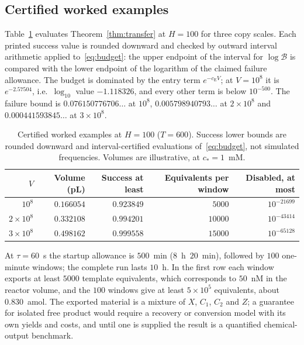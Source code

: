 \documentclass[11pt,a4paper]{article}
\theoremstyle{plain}
\theoremstyle{definition}
\theoremstyle{remark}
\newcommand{\Bud}{\mathcal B}
\newcommand{\cE}{c_{\mathrm E}}
\begin{document}
\subsection{Certified worked examples}
Table~\ref{tab:examples} evaluates Theorem~\ref{thm:transfer} at $H=100$ for three copy scales. Each printed success value is rounded downward and checked by outward interval arithmetic applied to~\eqref{eq:budget}: the upper endpoint of the interval for $\log\Bud$ is compared with the lower endpoint of the logarithm of the claimed failure allowance. The budget is dominated by the entry term $e^{-\cE V}$; at $V=10^8$ it is $e^{-2.57504}$, i.e.\ $\log_{10}$ value $-1.118326$, and every other term is below $10^{-500}$. The failure bound is $0.076150776706\ldots$ at $10^8$, $0.005798940793\ldots$ at $2\times10^8$ and $0.000441593845\ldots$ at $3\times10^8$.

\begin{table}[t]
\centering
\caption{Certified worked examples at $H=100$ ($T=600$). Success lower bounds are rounded downward and interval-certified evaluations of~\eqref{eq:budget}, not simulated frequencies. Volumes are illustrative, at $c_*=1$~mM.}\label{tab:examples}
\begin{tabular}{rrrrr}\toprule
$V$ & Volume (pL) & Success at least & Equivalents per window & Disabled, at most\\\midrule
$10^8$ & $0.166054$ & $0.923849$ & $5000$ & $10^{-21699}$\\
$2\times10^8$ & $0.332108$ & $0.994201$ & $10000$ & $10^{-43414}$\\
$3\times10^8$ & $0.498162$ & $0.999558$ & $15000$ & $10^{-65128}$\\\bottomrule
\end{tabular}
\end{table}

At $\tau=60$~s the startup allowance is $500$~min ($8$~h~$20$~min), followed by $100$ one-minute windows; the complete run lasts $10$~h. In the first row each window exports at least $5000$ template equivalents, which corresponds to $50$~nM in the reactor volume, and the $100$ windows give at least $5\times10^5$ equivalents, about $0.830$~amol. The exported material is a mixture of $X$, $C_1$, $C_2$ and $Z$; a guarantee for isolated free product would require a recovery or conversion model with its own yields and costs, and until one is supplied the result is a quantified chemical-output benchmark.
\end{document}
